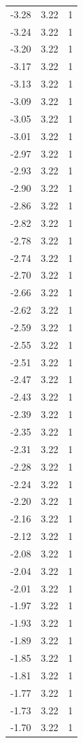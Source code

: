 \begin{longtable}{lrr}
  -3.28 & 3.22 & 1 \\
  -3.24 & 3.22 & 1 \\
  -3.20 & 3.22 & 1 \\
  -3.17 & 3.22 & 1 \\
  -3.13 & 3.22 & 1 \\
  -3.09 & 3.22 & 1 \\
  -3.05 & 3.22 & 1 \\
  -3.01 & 3.22 & 1 \\
  -2.97 & 3.22 & 1 \\
  -2.93 & 3.22 & 1 \\
  -2.90 & 3.22 & 1 \\
  -2.86 & 3.22 & 1 \\
  -2.82 & 3.22 & 1 \\
  -2.78 & 3.22 & 1 \\
  -2.74 & 3.22 & 1 \\
  -2.70 & 3.22 & 1 \\
  -2.66 & 3.22 & 1 \\
  -2.62 & 3.22 & 1 \\
  -2.59 & 3.22 & 1 \\
  -2.55 & 3.22 & 1 \\
  -2.51 & 3.22 & 1 \\
  -2.47 & 3.22 & 1 \\
  -2.43 & 3.22 & 1 \\
  -2.39 & 3.22 & 1 \\
  -2.35 & 3.22 & 1 \\
  -2.31 & 3.22 & 1 \\
  -2.28 & 3.22 & 1 \\
  -2.24 & 3.22 & 1 \\
  -2.20 & 3.22 & 1 \\
  -2.16 & 3.22 & 1 \\
  -2.12 & 3.22 & 1 \\
  -2.08 & 3.22 & 1 \\
  -2.04 & 3.22 & 1 \\
  -2.01 & 3.22 & 1 \\
  -1.97 & 3.22 & 1 \\
  -1.93 & 3.22 & 1 \\
  -1.89 & 3.22 & 1 \\
  -1.85 & 3.22 & 1 \\
  -1.81 & 3.22 & 1 \\
  -1.77 & 3.22 & 1 \\
  -1.73 & 3.22 & 1 \\
  -1.70 & 3.22 & 1 \\

\end{longtable}
